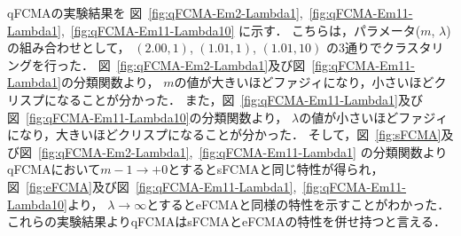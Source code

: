 \documentclass[a4j,12pt,dvipdfmx,oneside]{jsbook}
\theoremstyle{definition}
\begin{document}
  qFCMAの実験結果を
  図~\ref{fig:qFCMA-Em2-Lambda1},~\ref{fig:qFCMA-Em11-Lambda1},~\ref{fig:qFCMA-Em11-Lambda10}
  に示す．
  こちらは，パラメータ($m$, $\lambda$)の組み合わせとして，
  $(2.00, 1)$, $(1.01, 1)$, $(1.01, 10)$
  の3通りでクラスタリングを行った．
  図~\ref{fig:qFCMA-Em2-Lambda1}及び図~\ref{fig:qFCMA-Em11-Lambda1}の分類関数より，
  $m$の値が大きいほどファジィになり，小さいほどクリスプになることが分かった．
  また，図~\ref{fig:qFCMA-Em11-Lambda1}及び図~\ref{fig:qFCMA-Em11-Lambda10}の分類関数より，
  $\lambda$の値が小さいほどファジィになり，大きいほどクリスプになることが分かった．
  そして，図~\ref{fig:sFCMA}及び図~\ref{fig:qFCMA-Em2-Lambda1},~\ref{fig:qFCMA-Em11-Lambda1}
  の分類関数よりqFCMAにおいて$m-1\rightarrow+0$とするとsFCMAと同じ特性が得られ，
  図~\ref{fig:eFCMA}及び図~\ref{fig:qFCMA-Em11-Lambda1},~\ref{fig:qFCMA-Em11-Lambda10}より，
  $\lambda\rightarrow\infty$とするとeFCMAと同様の特性を示すことがわかった．
  これらの実験結果よりqFCMAはsFCMAとeFCMAの特性を併せ持つと言える．
\end{document}
